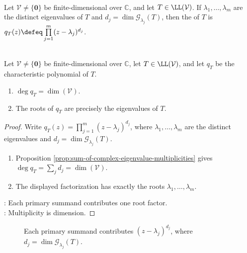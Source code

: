 \begin{definition} \label{def:operator-characteristic-polynomial} \\
Let $\mathcal{V}\neq\{\mathbf{0}\}$ be finite-dimensional over $\mathbb{C}$, and let $T\in\LL(\mathcal{V})$. If $\lambda_1,\ldots,\lambda_m$ are the distinct eigenvalues of $T$ and $d_j=\dim \mathcal{G}_{\lambda_j}(T)$, then the  of $T$ is $q_T(z)\defeq\prod\limits_{j=1}^{m}(z-\lambda_j)^{d_j}$.
\end{definition}

\begin{proposition} \label{prop:operator-characteristic-polynomial-degree-roots} \\
Let $\mathcal{V}\neq\{\mathbf{0}\}$ be finite-dimensional over $\mathbb{C}$, let $T\in\LL(\mathcal{V})$, and let $q_T$ be the characteristic polynomial of $T$.
\begin{enumerate}[label=(\roman*)]
\setlength{\itemsep}{0pt}
\item $\deg q_T=\dim(\mathcal{V})$.
\item The roots of $q_T$ are precisely the eigenvalues of $T$.
\end{enumerate}
\begin{proof}
Write $q_T(z)=\prod\limits_{j=1}^{m}(z-\lambda_j)^{d_j}$, where $\lambda_1,\ldots,\lambda_m$ are the distinct eigenvalues and $d_j=\dim \mathcal{G}_{\lambda_j}(T)$.
\begin{enumerate}[label=(\roman*)]
\setlength{\itemsep}{0pt}
\item Proposition \ref{prop:sum-of-complex-eigenvalue-multiplicities} gives $\deg q_T=\sum_jd_j=\dim(\mathcal{V})$.
\item The displayed factorization has exactly the roots $\lambda_1,\ldots,\lambda_m$.
\end{enumerate}
: Each primary summand contributes one root factor.\\
: Multiplicity is dimension.
\end{proof}
\end{proposition}

\begin{figure}[H]
  \centering
  
  \caption{Each primary summand contributes $(z-\lambda_j)^{d_j}$, where $d_j=\dim \mathcal{G}_{\lambda_j}(T)$.}
  \label{fig:operator-characteristic-polynomial-primary-blocks}
\end{figure}

